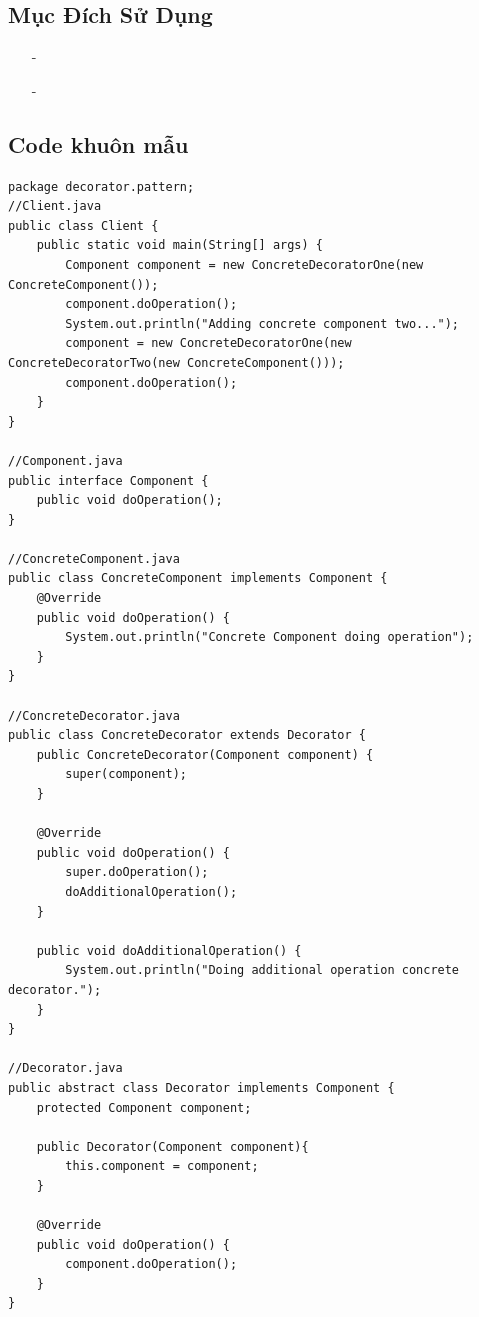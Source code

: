 \documentclass{article}
\newcommand\subpara{\fontsize{13}{13}\selectfont \fontseries{b}\selectfont}
\begin{document}
		\subsection{Mục Đích Sử Dụng}
		\begin{itemize}
			\item[-]\subpara{Thêm tính năng mới cho đối tượng mà không ảnh hưởng đến các đối tượng này}
			\item[-]\subpara{Trong các trường hợp mà việc sử dụng kế thừa sẽ mất nhiều công sức trong việc viết code hoặc không thể mở rộng đối tượng bằng thừa kế}
		\end{itemize}


		\subsection{Code khuôn mẫu}
		\begin{lstlisting}
package decorator.pattern;
//Client.java
public class Client {
    public static void main(String[] args) {
        Component component = new ConcreteDecoratorOne(new ConcreteComponent());
        component.doOperation();
        System.out.println("Adding concrete component two...");
        component = new ConcreteDecoratorOne(new ConcreteDecoratorTwo(new ConcreteComponent()));
        component.doOperation();
    }
}

//Component.java
public interface Component {
    public void doOperation();
}

//ConcreteComponent.java
public class ConcreteComponent implements Component {
    @Override
    public void doOperation() {
        System.out.println("Concrete Component doing operation");
    }
}

//ConcreteDecorator.java
public class ConcreteDecorator extends Decorator {
    public ConcreteDecorator(Component component) {
        super(component);
    }

    @Override
    public void doOperation() {
        super.doOperation();
        doAdditionalOperation();
    }

    public void doAdditionalOperation() {
        System.out.println("Doing additional operation concrete decorator.");
    }
}

//Decorator.java
public abstract class Decorator implements Component {
    protected Component component;

    public Decorator(Component component){
        this.component = component;
    }

    @Override
    public void doOperation() {
        component.doOperation();
    }
}
        \end{lstlisting}
\end{document}
